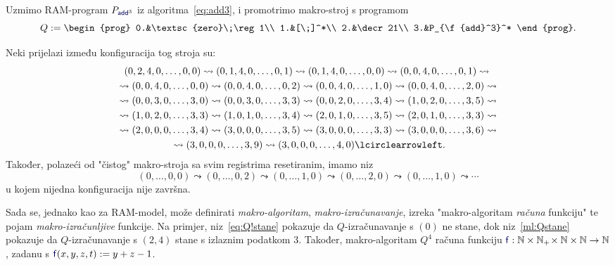\begin{primjer}[{name=[makro-program $Q$]}]\label{pr:makro}
Uzmimo RAM-program $P_{\f{add}^3}$ iz algoritma~\eqref{eq:add3}, i promotrimo makro-stroj s programom
\begin{equation}
    Q:=\begin{prog}
        0.&\textsc{zero}\;\reg1\\
        1.&[\;]^*\\
        2.&\decr21\\
        3.&P_{\f{add}^3}^*
    \end{prog}\text.
\end{equation}
\smallskip 

\noindent Neki prijelazi između konfiguracija tog stroja su:
\begin{multline}\label{ml:Qstane}
    (0,2,4,0,\dotsc,0,0)\leadsto
    (0,1,4,0,\dotsc,0,1)\leadsto
    (0,1,4,0,\dotsc,0,0)\leadsto
    (0,0,4,0,\dotsc,0,1)\leadsto{}\\{}\leadsto
    (0,0,4,0,\dotsc,0,0)\leadsto
    (0,0,4,0,\dotsc,0,2)\leadsto
    (0,0,4,0,\dotsc,1,0)\leadsto
    (0,0,4,0,\dotsc,2,0)\leadsto{}\\{}\leadsto
    (0,0,3,0,\dotsc,3,0)\leadsto
    (0,0,3,0,\dotsc,3,3)\leadsto
    (0,0,2,0,\dotsc,3,4)\leadsto
    (1,0,2,0,\dotsc,3,5)\leadsto{}\\{}\leadsto
    (1,0,2,0,\dotsc,3,3)\leadsto
    (1,0,1,0,\dotsc,3,4)\leadsto
    (2,0,1,0,\dotsc,3,5)\leadsto
    (2,0,1,0,\dotsc,3,3)\leadsto{}\\{}\leadsto
    (2,0,0,0,\dotsc,3,4)\leadsto
    (3,0,0,0,\dotsc,3,5)\leadsto
    (3,0,0,0,\dotsc,3,3)\leadsto
    (3,0,0,0,\dotsc,3,6)\leadsto{}\\{}\leadsto
    (3,0,0,0,\dotsc,3,9)\leadsto
    (3,0,0,0,\dotsc,4,0)\lcirclearrowleft\text.
\end{multline}
Također, polazeći od "čistog" makro-stroja sa svim registrima resetiranim, imamo niz
\begin{equation}\label{eq:Q!stane}
    (0,\dotsc,0,0)\leadsto
    (0,\dotsc,0,2)\leadsto
    (0,\dotsc,1,0)\leadsto
    (0,\dotsc,2,0)\leadsto
    (0,\dotsc,1,0)\leadsto\dotsb
\end{equation}
    u kojem nijedna konfiguracija nije završna.
\end{primjer}

Sada se, jednako kao za RAM-model, može definirati \emph{makro-algoritam}, \emph{makro-iz\-ra\-ču\-na\-va\-nje}, izreka "makro-algoritam \emph{računa} funkciju" te pojam \emph{makro-izračunljive} funkcije. Na primjer, niz~\eqref{eq:Q!stane} pokazuje da $Q$-izračunavanje s $(0)$ ne stane, dok niz~\eqref{ml:Qstane} pokazuje da $Q$-izračunavanje s $(2,4)$ stane s izlaznim podatkom $3$. Također, makro-algoritam $Q^4$ računa funkciju $\f{f}:\N\times\N_+\!\times\N\times\N\to\N$, zadanu s $\f{f}(x,y,z,t):=y+z-1$.

